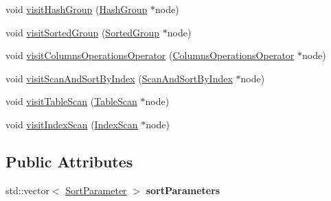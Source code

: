 \begin{DoxyCompactItemize}
void \hyperlink{class_sort_resolving_physical_operator_visitor_a825bb376e6a827d7b45495efcb16f83b}{visit\+Hash\+Group} (\hyperlink{class_hash_group}{Hash\+Group} $\ast$node)
\item 
void \hyperlink{class_sort_resolving_physical_operator_visitor_ae3d9a9443c6dc80abfdb9bee939f7718}{visit\+Sorted\+Group} (\hyperlink{class_sorted_group}{Sorted\+Group} $\ast$node)
\item 
void \hyperlink{class_sort_resolving_physical_operator_visitor_a22bf2c5442c65d923a166269ac45f5ab}{visit\+Columns\+Operations\+Operator} (\hyperlink{class_columns_operations_operator}{Columns\+Operations\+Operator} $\ast$node)
\item 
void \hyperlink{class_sort_resolving_physical_operator_visitor_aca7c9e51a6d7b86b05633877c4cb3bfb}{visit\+Scan\+And\+Sort\+By\+Index} (\hyperlink{class_scan_and_sort_by_index}{Scan\+And\+Sort\+By\+Index} $\ast$node)
\item 
void \hyperlink{class_sort_resolving_physical_operator_visitor_a39e47ce8a74242f9f2d4b5b98f7a4bb9}{visit\+Table\+Scan} (\hyperlink{class_table_scan}{Table\+Scan} $\ast$node)
\item 
void \hyperlink{class_sort_resolving_physical_operator_visitor_a2ea2205b6cdf14abf427d65e486116d8}{visit\+Index\+Scan} (\hyperlink{class_index_scan}{Index\+Scan} $\ast$node)
\end{DoxyCompactItemize}
\subsection*{Public Attributes}
\begin{DoxyCompactItemize}
\item 
\hypertarget{class_sort_resolving_physical_operator_visitor_aa962193d5211541430e94f2a0961c641}{std\+::vector$<$ \hyperlink{class_sort_parameter}{Sort\+Parameter} $>$ {\bfseries sort\+Parameters}}\label{class_sort_resolving_physical_operator_visitor_aa962193d5211541430e94f2a0961c641}

\end{DoxyCompactItemize}


